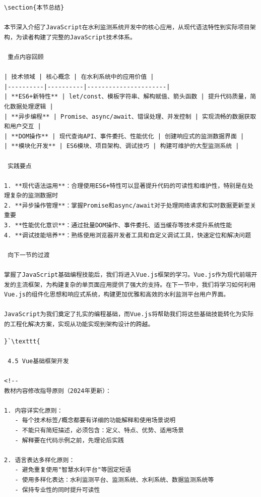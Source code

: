 {{\begin{lstlisting}
\section{本节总结}

本节深入介绍了JavaScript在水利监测系统开发中的核心应用，从现代语法特性到实际项目架构，为读者构建了完整的JavaScript技术体系。

 重点内容回顾

| 技术领域 | 核心概念 | 在水利系统中的应用价值 |
|----------|----------|----------------------|
| **ES6+新特性** | let/const、模板字符串、解构赋值、箭头函数 | 提升代码质量，简化数据处理逻辑 |
| **异步编程** | Promise、async/await、错误处理、并发控制 | 实现流畅的数据获取和用户交互 |
| **DOM操作** | 现代查询API、事件委托、性能优化 | 创建响应式的监测数据界面 |
| **模块化开发** | ES6模块、项目架构、调试技巧 | 构建可维护的大型监测系统 |

 实践要点

1. **现代语法运用**：合理使用ES6+特性可以显著提升代码的可读性和维护性，特别是在处理复杂的监测数据时
2. **异步操作管理**：掌握Promise和async/await对于处理网络请求和实时数据更新至关重要
3. **性能优化意识**：通过批量DOM操作、事件委托、适当缓存等技术提升系统性能
4. **调试技能培养**：熟练使用浏览器开发者工具和自定义调试工具，快速定位和解决问题

 向下一节的过渡

掌握了JavaScript基础编程技能后，我们将进入Vue.js框架的学习。Vue.js作为现代前端开发的主流框架，为构建复杂的单页面应用提供了强大的支持。在下一节中，我们将学习如何利用Vue.js的组件化思想和响应式系统，构建更加优雅和高效的水利监测平台用户界面。

JavaScript为我们奠定了扎实的编程基础，而Vue.js将帮助我们将这些基础技能转化为实际的工程化解决方案，实现从功能实现到架构设计的跨越。
\end{lstlisting}

\begin{lstlisting}
}`\texttt{

 4.5 Vue基础框架开发

<!--
教材内容修改指导原则（2024年更新）：

1. 内容详实化原则：
   - 每个技术标签/概念都要有详细的功能解释和使用场景说明
   - 不能只有简短描述，必须包含：定义、特点、优势、适用场景
   - 解释要在代码示例之前，先理论后实践

2. 语言表达多样化原则：
   - 避免重复使用"智慧水利平台"等固定短语
   - 使用多样化表达：水利监测平台、监测系统、水利系统、数据监测系统等
   - 保持专业性的同时提升可读性


\end{lstlisting}}}
